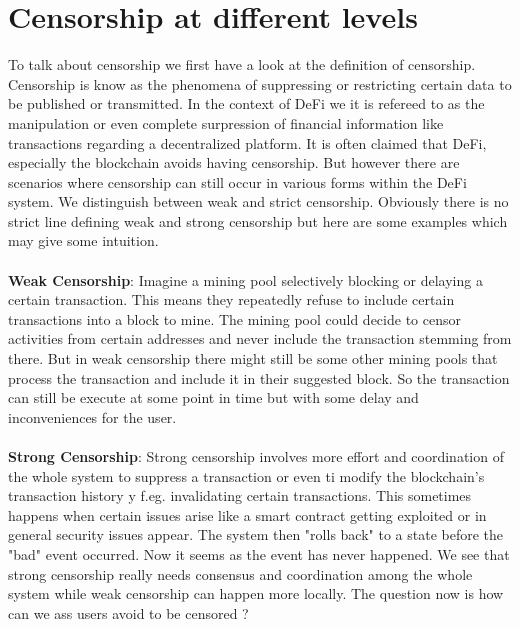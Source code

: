 \documentclass{article}
\begin{document}
\section{Censorship at different levels}
To talk about censorship we first have a look at the definition of censorship. Censorship is know as the phenomena of suppressing or restricting certain data to be published or transmitted. In the context of DeFi we it is refereed to as the manipulation or even complete surpression of financial information like transactions regarding a decentralized platform. It is often claimed that DeFi, especially the blockchain avoids having censorship. But however there are scenarios where censorship  can still occur in various forms within the DeFi system. We distinguish between weak and strict censorship. Obviously there is no strict line defining weak and strong censorship but here are some examples which may give some intuition.
\\
\\
\textbf{Weak Censorship}: 
Imagine a mining pool selectively blocking or delaying a certain transaction. This means they repeatedly refuse to include certain transactions into a block to mine. The mining pool could decide to censor activities from certain addresses and never include the transaction stemming from there. But in weak censorship there might still be some other mining pools that process the transaction and include it in their suggested block. So the transaction can still be execute at some point in time but with some delay and inconveniences for the user.\\
\\
\textbf{Strong Censorship}: 
Strong censorship involves more effort and coordination of the whole system to suppress a transaction or even ti modify the blockchain's transaction history y f.eg. invalidating certain transactions. This sometimes happens when certain issues arise like a smart contract getting exploited or in general security issues appear. The system then "rolls back" to a state before the "bad" event occurred. Now it seems as the event has never happened. We see that strong censorship really needs consensus and coordination among the whole system while weak censorship can happen more locally.
The question now is how can we ass users avoid to be censored ?
\end{document}
